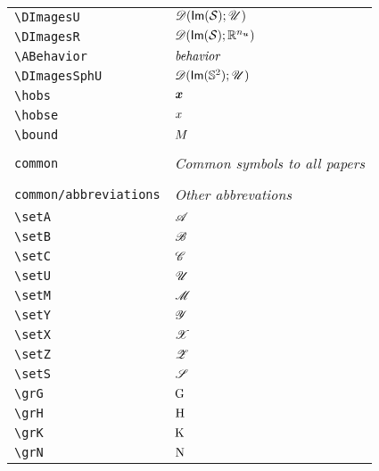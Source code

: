 \begin{longtable}{lll}
 {\color[rgb]{0.5,0.5,0.5}\texttt{\textbackslash DImagesU}} & $\DImagesU$ & \\ 
 {\color[rgb]{0.5,0.5,0.5}\texttt{\textbackslash DImagesR}} & $\DImagesR$ & \\ 
 {\color[rgb]{0.5,0.5,0.5}\texttt{\textbackslash ABehavior}} & $\textit{behavior}$ & \\ 
 {\color[rgb]{0.5,0.5,0.5}\texttt{\textbackslash DImagesSphU}} & $\mathscr{D}(\mathsf{Im}(\mathbb{S}^2);\mathscr{U})$ & \\ 
 {\color[rgb]{0.5,0.5,0.5}\texttt{\textbackslash hobs}} & $\boldsymbol{x}$ & \\ 
 {\color[rgb]{0.5,0.5,0.5}\texttt{\textbackslash hobse}} & $x$ & \\ 
 {\color[rgb]{0.5,0.5,0.5}\texttt{\textbackslash bound}} & $M$ & \\ 
  &  & \\ 
 {\color[rgb]{0.5,0.5,0.5}\texttt{common}} & \multicolumn{2}{l}{\emph{Common symbols to all papers}}\\ 
 \hline
\hline
 &  & \\ 
 {\color[rgb]{0.5,0.5,0.5}\texttt{common/abbreviations}} & \multicolumn{2}{l}{\emph{Other abbrevations}}\\ 
 \hline
{\color[rgb]{0.5,0.5,0.5}\texttt{\textbackslash setA}} & $\mathscr{A}$ & \\ 
 {\color[rgb]{0.5,0.5,0.5}\texttt{\textbackslash setB}} & $\mathscr{B}$ & \\ 
 {\color[rgb]{0.5,0.5,0.5}\texttt{\textbackslash setC}} & $\mathscr{C}$ & \\ 
 {\color[rgb]{0.5,0.5,0.5}\texttt{\textbackslash setU}} & $\mathscr{U}$ & \\ 
 {\color[rgb]{0.5,0.5,0.5}\texttt{\textbackslash setM}} & $\mathscr{M}$ & \\ 
 {\color[rgb]{0.5,0.5,0.5}\texttt{\textbackslash setY}} & $\mathscr{Y}$ & \\ 
 {\color[rgb]{0.5,0.5,0.5}\texttt{\textbackslash setX}} & $\mathscr{X}$ & \\ 
 {\color[rgb]{0.5,0.5,0.5}\texttt{\textbackslash setZ}} & $\mathscr{Z}$ & \\ 
 {\color[rgb]{0.5,0.5,0.5}\texttt{\textbackslash setS}} & $\mathscr{S}$ & \\ 
 {\color[rgb]{0.5,0.5,0.5}\texttt{\textbackslash grG}} & $\mathrm{G}$ & \\ 
 {\color[rgb]{0.5,0.5,0.5}\texttt{\textbackslash grH}} & $\mathrm{H}$ & \\ 
 {\color[rgb]{0.5,0.5,0.5}\texttt{\textbackslash grK}} & $\mathrm{K}$ & \\ 
 {\color[rgb]{0.5,0.5,0.5}\texttt{\textbackslash grN}} & $\mathrm{N}$ & \\ 

\end{longtable}
